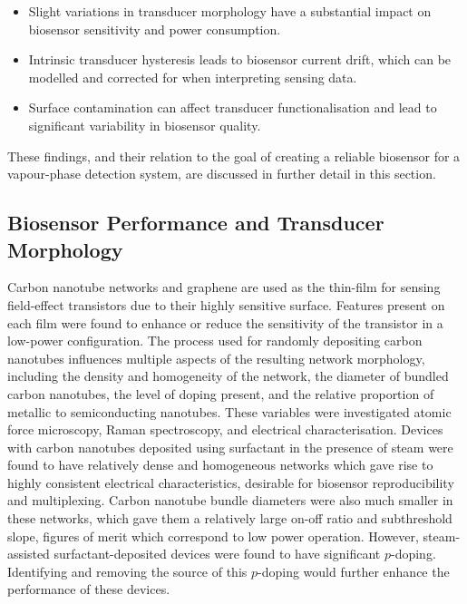 \documentclass[
  a4paper,
]{scrbook}
\begin{document}
\begin{itemize}
\item
  Slight variations in transducer morphology have a substantial impact
  on biosensor sensitivity and power consumption.
\item
  Intrinsic transducer hysteresis leads to biosensor current drift,
  which can be modelled and corrected for when interpreting sensing
  data.
\item
  Surface contamination can affect transducer functionalisation and lead
  to significant variability in biosensor quality.
\end{itemize}

These findings, and their relation to the goal of creating a reliable
biosensor for a vapour-phase detection system, are discussed in further
detail in this section.

\hypertarget{biosensor-performance-and-transducer-morphology}{%
\subsection{Biosensor Performance and Transducer
Morphology}\label{biosensor-performance-and-transducer-morphology}}

Carbon nanotube networks and graphene are used as the thin-film for
sensing field-effect transistors due to their highly sensitive surface.
Features present on each film were found to enhance or reduce the
sensitivity of the transistor in a low-power configuration. The process
used for randomly depositing carbon nanotubes influences multiple
aspects of the resulting network morphology, including the density and
homogeneity of the network, the diameter of bundled carbon nanotubes,
the level of doping present, and the relative proportion of metallic to
semiconducting nanotubes. These variables were investigated atomic force
microscopy, Raman spectroscopy, and electrical characterisation. Devices
with carbon nanotubes deposited using surfactant in the presence of
steam were found to have relatively dense and homogeneous networks which
gave rise to highly consistent electrical characteristics, desirable for
biosensor reproducibility and multiplexing. Carbon nanotube bundle
diameters were also much smaller in these networks, which gave them a
relatively large on-off ratio and subthreshold slope, figures of merit
which correspond to low power operation. However, steam-assisted
surfactant-deposited devices were found to have significant
\(p\)-doping. Identifying and removing the source of this \(p\)-doping
would further enhance the performance of these devices.
\end{document}
